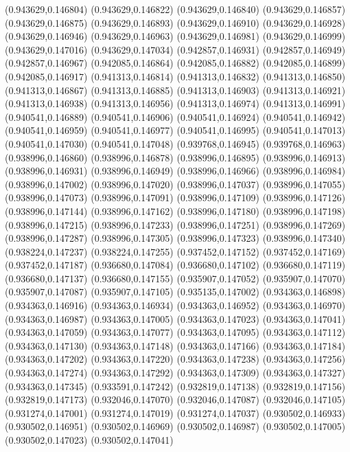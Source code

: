(0.943629,0.146804)
(0.943629,0.146822)
(0.943629,0.146840)
(0.943629,0.146857)
(0.943629,0.146875)
(0.943629,0.146893)
(0.943629,0.146910)
(0.943629,0.146928)
(0.943629,0.146946)
(0.943629,0.146963)
(0.943629,0.146981)
(0.943629,0.146999)
(0.943629,0.147016)
(0.943629,0.147034)
(0.942857,0.146931)
(0.942857,0.146949)
(0.942857,0.146967)
(0.942085,0.146864)
(0.942085,0.146882)
(0.942085,0.146899)
(0.942085,0.146917)
(0.941313,0.146814)
(0.941313,0.146832)
(0.941313,0.146850)
(0.941313,0.146867)
(0.941313,0.146885)
(0.941313,0.146903)
(0.941313,0.146921)
(0.941313,0.146938)
(0.941313,0.146956)
(0.941313,0.146974)
(0.941313,0.146991)
(0.940541,0.146889)
(0.940541,0.146906)
(0.940541,0.146924)
(0.940541,0.146942)
(0.940541,0.146959)
(0.940541,0.146977)
(0.940541,0.146995)
(0.940541,0.147013)
(0.940541,0.147030)
(0.940541,0.147048)
(0.939768,0.146945)
(0.939768,0.146963)
(0.938996,0.146860)
(0.938996,0.146878)
(0.938996,0.146895)
(0.938996,0.146913)
(0.938996,0.146931)
(0.938996,0.146949)
(0.938996,0.146966)
(0.938996,0.146984)
(0.938996,0.147002)
(0.938996,0.147020)
(0.938996,0.147037)
(0.938996,0.147055)
(0.938996,0.147073)
(0.938996,0.147091)
(0.938996,0.147109)
(0.938996,0.147126)
(0.938996,0.147144)
(0.938996,0.147162)
(0.938996,0.147180)
(0.938996,0.147198)
(0.938996,0.147215)
(0.938996,0.147233)
(0.938996,0.147251)
(0.938996,0.147269)
(0.938996,0.147287)
(0.938996,0.147305)
(0.938996,0.147323)
(0.938996,0.147340)
(0.938224,0.147237)
(0.938224,0.147255)
(0.937452,0.147152)
(0.937452,0.147169)
(0.937452,0.147187)
(0.936680,0.147084)
(0.936680,0.147102)
(0.936680,0.147119)
(0.936680,0.147137)
(0.936680,0.147155)
(0.935907,0.147052)
(0.935907,0.147070)
(0.935907,0.147087)
(0.935907,0.147105)
(0.935135,0.147002)
(0.934363,0.146898)
(0.934363,0.146916)
(0.934363,0.146934)
(0.934363,0.146952)
(0.934363,0.146970)
(0.934363,0.146987)
(0.934363,0.147005)
(0.934363,0.147023)
(0.934363,0.147041)
(0.934363,0.147059)
(0.934363,0.147077)
(0.934363,0.147095)
(0.934363,0.147112)
(0.934363,0.147130)
(0.934363,0.147148)
(0.934363,0.147166)
(0.934363,0.147184)
(0.934363,0.147202)
(0.934363,0.147220)
(0.934363,0.147238)
(0.934363,0.147256)
(0.934363,0.147274)
(0.934363,0.147292)
(0.934363,0.147309)
(0.934363,0.147327)
(0.934363,0.147345)
(0.933591,0.147242)
(0.932819,0.147138)
(0.932819,0.147156)
(0.932819,0.147173)
(0.932046,0.147070)
(0.932046,0.147087)
(0.932046,0.147105)
(0.931274,0.147001)
(0.931274,0.147019)
(0.931274,0.147037)
(0.930502,0.146933)
(0.930502,0.146951)
(0.930502,0.146969)
(0.930502,0.146987)
(0.930502,0.147005)
(0.930502,0.147023)
(0.930502,0.147041)
